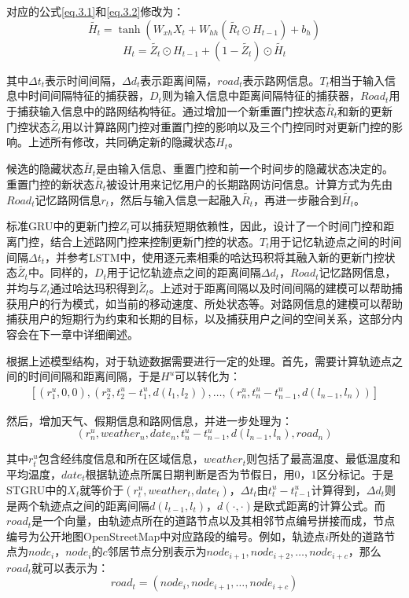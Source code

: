 \documentclass[master]{thesis-uestc}
\begin{document}
对应的公式\ref{eq.3.1}和\ref{eq.3.2}修改为：
\begin{equation}
  \tilde{H_t} = \tanh(W_{xh}X_t + W_{hh}(\tilde{R_t} \odot H_{t-1})+b_h)
\label{eq.3.3}
\end{equation}
\begin{equation}
  H_t = \tilde{Z_t}\odot H_{t-1}+(1-\tilde{Z_t})\odot \tilde{H_t}
\label{eq.3.4}
\end{equation}

其中$\Delta t_t$表示时间间隔，$\Delta d_t$表示距离间隔，$road_t$表示路网信息。$T_t$相当于输入信息中时间间隔特征的捕获器，$D_t$则为输入信息中距离间隔特征的捕获器，$Road_t$用于捕获输入信息中的路网结构特征。通过增加一个新重置门控状态$\tilde{R_t}$和新的更新门控状态$\tilde{Z_t}$用以计算路网门控对重置门控的影响以及三个门控同时对更新门控的影响。上述所有修改，共同确定新的隐藏状态$H_t$。

候选的隐藏状态$\tilde{H_t}$是由输入信息、重置门控和前一个时间步的隐藏状态决定的。重置门控的新状态$\tilde{R_t}$被设计用来记忆用户的长期路网访问信息。计算方式为先由$Road_t$记忆路网信息$r_t$，然后与输入信息一起融入$\tilde{R_t}$，再进一步融合到$\tilde{H_t}$。

标准GRU中的更新门控$Z_t$可以捕获短期依赖性，因此，设计了一个时间门控和距离门控，结合上述路网门控来控制更新门控的状态。$T_t$用于记忆轨迹点之间的时间间隔$\Delta t_t$，并参考LSTM中，使用逐元素相乘的哈达玛积将其融入新的更新门控状态$\tilde{Z_t}$中。同样的，$D_t$用于记忆轨迹点之间的距离间隔$\Delta d_t$，$Road_t$记忆路网信息，并均与$Z_t$通过哈达玛积得到$\tilde{Z_t}$。上述对于距离间隔以及时间间隔的建模可以帮助捕获用户的行为模式，如当前的移动速度、所处状态等。对路网信息的建模可以帮助捕获用户的短期行为约束和长期的目标，以及捕获用户之间的空间关系，这部分内容会在下一章中详细阐述。

根据上述模型结构，对于轨迹数据需要进行一定的处理。首先，需要计算轨迹点之间的时间间隔和距离间隔，于是$H^u$可以转化为：
\begin{equation}
\begin{split}
  [(r^u_1,0,0),(r^u_2,t^u_2-t^u_1,d (l_1,l_2)),\dots,
  (r^u_n,t^u_n-t^u_{n-1},d(l_{n-1},l_n))]
\end{split}
\end{equation}

然后，增加天气、假期信息和路网信息，并进一步处理为：
\begin{equation}
(r^u_n,weather_n,date_n,t^u_n-t^u_{n-1},d(l_{n-1},l_n),road_n)
\end{equation}

其中$r^u_t$包含经纬度信息和所在区域信息，$weather_t$则包括了最高温度、最低温度和平均温度，$date_t$根据轨迹点所属日期判断是否为节假日，用0，1区分标记。于是STGRU中的$X_t$就等价于$(r^u_t,weather_t,date_t)$，$\Delta t_t$由$t^u_t-t^u_{t-1}$计算得到，$\Delta d_t$则是两个轨迹点之间的距离间隔$d(l_{t-1}, l_{t})$，$d(\cdot,\cdot)$是欧式距离的计算公式。而$road_t$是一个向量，由轨迹点所在的道路节点以及其相邻节点编号拼接而成，节点编号为公开地图OpenStreetMap中对应路段的编号。例如，轨迹点$i$所处的道路节点为$node_i$，$node_i$的$c$邻居节点分别表示为$node_{i+1},node_{i+2},\dots,node_{i+c}$，那么$road_t$就可以表示为：
\begin{equation}
road_t = (node_{i},node_{i+1},\dots,node_{i+c})
\end{equation}
\end{document}
